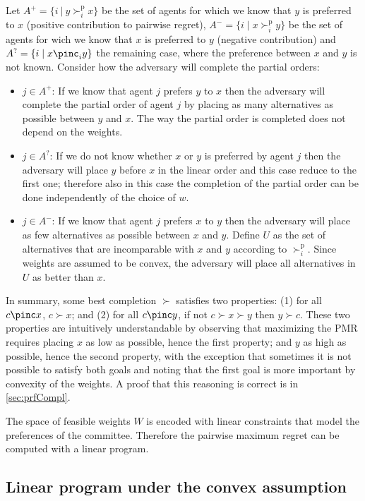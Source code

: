 \documentclass[12pt]{article}
\newcommand{\pref}{\succ}%
\newcommand{\ppref}{\succ^\text{p}}%
\begin{document}
Let $A^+=\{ i \ | \ y \ppref_i x\}$ be the set of agents for which we know that $y$ is preferred to $x$ (positive contribution to pairwise regret), $A^-=\{ i \mid x \ppref_i y\}$ 
be the set of agents for wich we  know that $x$ is preferred to $y$ (negative contribution) and $A^?=\{ i \mid x \pinc_i y\}$ the remaining case, where the preference between $x$ and $y$ is not known.
Consider how the adversary will complete the partial orders:
\begin{itemize}
 \item $j \in A^+$: If we know that agent $j$ prefers $y$ to $x$ then the adversary will complete the partial order of agent $j$ by placing as many alternatives as possible between $y$ and $x$.
 The way the partial order is completed does not depend on the weights.

 \item $j \in A^?$: If we do not know whether $x$ or $y$ is preferred by agent $j$ then the adversary will place $y$ before $x$ in the linear order and this case reduce to the first one; therefore also in this case the completion of the partial order can be done independently of the choice of $w$.

 \item $j \in A^-$: If we know that agent $j$ prefers $x$ to $y$ then the adversary will place as few alternatives as possible between $x$ and $y$.
Define $U$ as the set of alternatives that are incomparable with $x$ and $y$ according to $\ppref_i$. Since weights are assumed to be convex, the adversary will place all alternatives in $U$ as better than $x$.
\end{itemize}
In summary, some best completion $\pref$ satisfies two properties: (1) for all $c \pinc x$, $c \pref x$; and (2) for all $c \pinc y$, if not $c \pref x \pref y$ then $y \pref c$. These two properties are intuitively understandable by observing that maximizing the PMR requires placing $x$ as low as possible, hence the first property; and $y$ as high as possible, hence the second property, with the exception that sometimes it is not possible to satisfy both goals and noting that the first goal is more important by convexity of the weights. 
A proof that this reasoning is correct is in \cref{sec:prfCompl}.

The space of feasible weights $W$ is encoded with linear constraints that model the preferences of the committee.
Therefore the pairwise maximum regret can be computed with a linear program.

\subsection{Linear program under the convex assumption}
\end{document}
